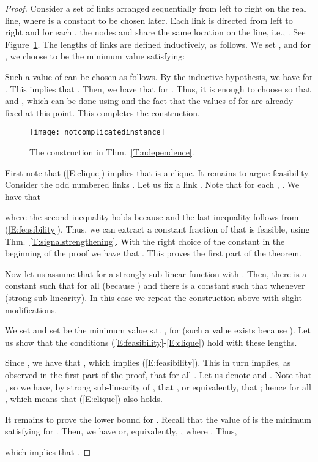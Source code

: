 \documentclass[11pt]{article}
\begin{document}
\begin{proof}
Consider a set of  links  arranged sequentially from left to right on the real line, where  is a constant to be chosen later. Each link  is directed from left to right
and for each , the nodes  and  share the same location on the line,  i.e., . See Figure~\ref{fig:notcomplicated}.
 The lengths of links are defined inductively, as follows. We set , and for , we choose  to be the minimum value satisfying:

Such a value of  can be chosen as follows. By the inductive hypothesis, we have  for . This implies that . Then, we have that  for . Thus, it is enough to choose  so that  and , which can be done using  and the fact that the values of  for  are already fixed at this point. This completes the construction.
\begin{figure}[htbp]
\begin{center}
\texttt{[image: notcomplicatedinstance]}
\caption{The construction in Thm.\ \ref{T:ndependence}.}
\label{fig:notcomplicated}
\end{center}
\end{figure}
First note that (\ref{E:clique}) implies that  is a clique. It remains to argue feasibility. Consider the odd numbered links . Let us fix a link . Note that for each , . We have that

where the second inequality holds because  and the last inequality follows from (\ref{E:feasibility}). Thus, we can extract a constant fraction  of  that is feasible, using Thm.\ \ref{T:signalstrengthening}. With the right choice of the constant  in the beginning of the proof we  have that . This proves the first part of the theorem.

Now let us assume that  for a strongly sub-linear function  with . Then, there is a constant  such that  for all  (because ) and there is a constant  such that  whenever  (strong sub-linearity). In this case we repeat the construction above with slight modifications. 

We set  and set   be the minimum value s.t. , for  (such a value exists because ). Let us show that the conditions (\ref{E:feasibility}-\ref{E:clique}) hold with these lengths.
  
Since , we have that , which implies (\ref{E:feasibility}). This in turn implies, as observed in the first part of the proof, that  for all . Let us denote  and . Note that , so we have, by strong sub-linearity of ,  that , or equivalently, that ; hence  for all , which means that (\ref{E:clique}) also holds. 

It remains to prove the lower bound for . Recall that the value of  is the minimum satisfying  for . Then, we have  or, equivalently, , where . Thus,

  which implies that .
\end{proof}
\end{document}
